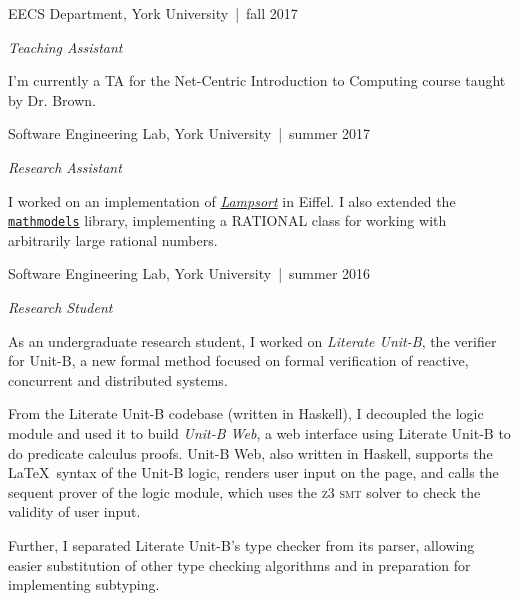 \documentclass[12pt,letterpaper]{article}
\renewenvironment{itemize}{
  \begin{list}{}{
    \setlength{\leftmargin}{1.5em}
    \setlength{\itemsep}{0.25em}
    \setlength{\parskip}{0pt}
    \setlength{\parsep}{0.25em}
  }
}{
  \end{list}
}
\begin{document}
\begin{itemize}
\item {\large EECS Department, } York University\, |\, {\small fall 2017}

  \textit{Teaching Assistant}

  \begin{itemize}
  \item I'm currently a TA for the Net-Centric Introduction to Computing course
    taught by Dr. Brown.
  \end{itemize}

\item {\large Software Engineering Lab, } York University\, |\, {\small summer
  2017}

  \textit{Research Assistant}

  \begin{itemize}
  \item I worked on an implementation of
    \href{https://bertrandmeyer.com/2014/12/07/lampsort/}{\textit{Lampsort}} in
    Eiffel. I also extended the
    \href{https://svn.eecs.yorku.ca/repos/sel-open/mathmodels/}{\texttt{mathmodels}}
    library, implementing a \textsc{RATIONAL} class for working with arbitrarily
    large rational numbers.
  \end{itemize}

\item {\large Software Engineering Lab, } York University\, |\, {\small summer
    2016}

  \textit{Research Student}

  \begin{itemize}
  \item As an undergraduate research student, I worked on \textit{Literate
      Unit-B}, the verifier for Unit-B, a new formal method focused on formal
    verification of reactive, concurrent and distributed systems.

    From the Literate Unit-B codebase (written in Haskell), I decoupled the
    logic module and used it to build \textit{Unit-B Web}, a web interface using
    Literate Unit-B to do predicate calculus proofs. \linebreak Unit-B Web, also
    written in Haskell, supports the \LaTeX\ syntax of the Unit-B logic, renders
    user input on the page, and calls the sequent prover of the logic module,
    which uses the \textsc{z3 smt} solver to check the validity of user input.

  \item Further, I separated Literate Unit-B's type checker from its parser,
    allowing easier substitution of other type checking algorithms and in
    preparation for implementing subtyping.
  \end{itemize}
\end{itemize}
\end{document}
